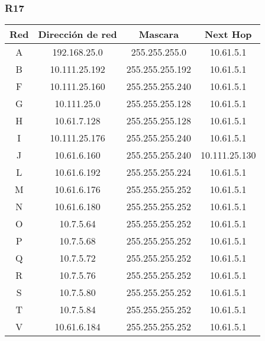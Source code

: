 \subsubsection{R17}
\begin{table}[!htbp]
\centering
  \begin{tabular}{|c|c|c|c|}
    \hline
	Red & Dirección de red & Mascara & Next Hop\\ \hline
	A & 192.168.25.0 & 255.255.255.0 & 10.61.5.1 \\ \hline
	B & 10.111.25.192 & 255.255.255.192 & 10.61.5.1 \\ \hline
	F & 10.111.25.160 & 255.255.255.240 & 10.61.5.1 \\ \hline
	G & 10.111.25.0 & 255.255.255.128 & 10.61.5.1 \\ \hline
	H & 10.61.7.128 & 255.255.255.128 & 10.61.5.1 \\ \hline
	I & 10.111.25.176 & 255.255.255.240 & 10.61.5.1 \\ \hline
	J & 10.61.6.160 & 255.255.255.240 & 10.111.25.130 \\ \hline
	L & 10.61.6.192 & 255.255.255.224 & 10.61.5.1 \\ \hline
	M & 10.61.6.176 & 255.255.255.252 & 10.61.5.1 \\ \hline
	N & 10.61.6.180 & 255.255.255.252 & 10.61.5.1 \\ \hline
	O & 10.7.5.64 & 255.255.255.252 & 10.61.5.1 \\ \hline
	P & 10.7.5.68 & 255.255.255.252 & 10.61.5.1 \\ \hline
	Q & 10.7.5.72 & 255.255.255.252 & 10.61.5.1 \\ \hline
	R & 10.7.5.76 & 255.255.255.252 & 10.61.5.1 \\ \hline
	S & 10.7.5.80 & 255.255.255.252 & 10.61.5.1 \\ \hline
	T & 10.7.5.84 & 255.255.255.252 & 10.61.5.1 \\ \hline
	V & 10.61.6.184 & 255.255.255.252 & 10.61.5.1 \\
    \hline
  \end{tabular}
\end{table}

\newpage
